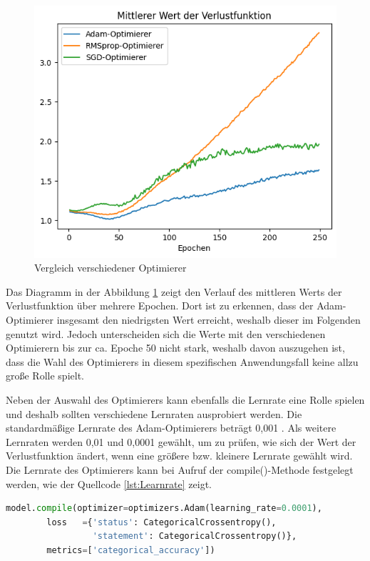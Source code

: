 \begin{figure}[H]
    \centering
    \includegraphics[width=.75\textwidth]{abbildungen/Optimierer/LossOptimierer.png}
    \caption{Vergleich verschiedener Optimierer}
    \label{fig:LossOptimierer}
\end{figure}

Das Diagramm in der Abbildung \ref*{fig:LossOptimierer} zeigt den Verlauf des mittleren Werts der Verlustfunktion über mehrere Epochen. Dort ist zu erkennen, dass 
der Adam-Optimierer insgesamt den niedrigsten Wert erreicht, weshalb dieser im Folgenden genutzt wird. Jedoch
unterscheiden sich die Werte mit den verschiedenen Optimierern bis zur ca. Epoche 50 nicht stark, weshalb davon auszugehen ist, dass die Wahl des Optimierers in diesem spezifischen
Anwendungsfall keine allzu große Rolle spielt.

Neben der Auswahl des Optimierers kann ebenfalls die Lernrate eine Rolle spielen und deshalb sollten verschiedene Lernraten ausprobiert werden. Die 
standardmäßige Lernrate des Adam-Optimierers beträgt 0,001 \cite{KerasDoc}. Als weitere Lernraten werden 0,01 und 0,0001 gewählt, um zu prüfen, wie 
sich der Wert der Verlustfunktion ändert, wenn eine größere bzw. kleinere Lernrate gewählt wird.
Die Lernrate des Optimierers kann bei Aufruf der compile()-Methode festgelegt werden, wie der Quellcode \ref*{lst:Learnrate} zeigt.

\begin{lstlisting}[language = python, caption={Wahl der Lernrate},captionpos=b, label = lst:Learnrate, floatplacement=H]
    model.compile(optimizer=optimizers.Adam(learning_rate=0.0001),
        loss   ={'status': CategoricalCrossentropy(), 
                 'statement': CategoricalCrossentropy()},
        metrics=['categorical_accuracy'])
\end{lstlisting}

